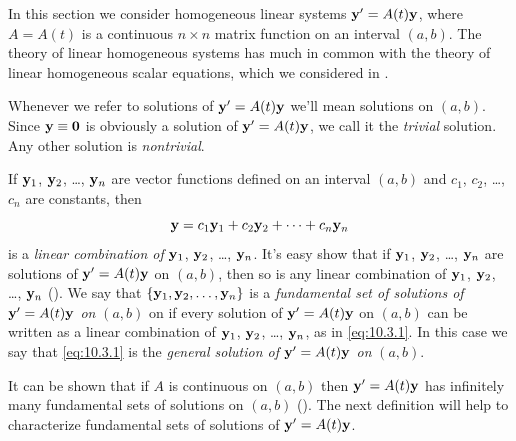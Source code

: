 In this section we consider homogeneous linear systems $\mathbf{y}'=
A(t)\mathbf{y}$, where $A=A(t)$ is a continuous $n\times n$ matrix
function on an interval $(a,b)$. The theory of linear homogeneous
systems has much in common with the theory of linear homogeneous
scalar equations, which we considered in
.

Whenever we refer to solutions of $\mathbf{y}'=A(t)\mathbf{y}$ we'll mean
solutions on $(a,b)$. Since $\mathbf{y}\equiv\mathbf{0}$ is obviously a
solution of $\mathbf{y}'=A(t)\mathbf{y}$, we call it the \emph{\color{blue}trivial}
solution. Any other solution is
\emph{\color{blue}nontrivial}.

If $\mathbf{y}_1$, $\mathbf{y}_2$, \dots, $\mathbf{y}_n$ are vector functions
defined on an interval $(a,b)$ and $c_1$, $c_2$, \dots, $c_n$ are
constants, then
\begin{equation} \label{eq:10.3.1}
\mathbf{y}=c_1\mathbf{y}_1+c_2\mathbf{y}_2+\cdots+c_n\mathbf{y}_n
\end{equation}
is a \emph{\color{blue}linear combination of} $\mathbf{y}_1$, $\mathbf{y}_2$,
\ldots, $\mathbf{y}_n$. It's easy show that if $\mathbf{y}_1$, $\mathbf{y}_2$,
\dots, $\mathbf{y}_n$ are solutions of $\mathbf{y}'=A(t)\mathbf{y}$ on $(a,b)$, then so is any linear combination of
 $\mathbf{y}_1$, $\mathbf{y}_2$, \dots, $\mathbf{y}_n$ (). We say that
$\{\mathbf{y}_1,\mathbf{y}_2,\dots,\mathbf{y}_n\}$ is a
\emph{\color{blue}fundamental set of solutions of $\mathbf{y}'=A(t)\mathbf{y}$ on}
$(a,b)$ on if every solution of
$\mathbf{y}'=A(t)\mathbf{y}$ on $(a,b)$ can be written as a linear combination of
$\mathbf{y}_1$, $\mathbf{y}_2$, \dots, $\mathbf{y}_n$, as in \eqref{eq:10.3.1}.
In this
case we say that \eqref{eq:10.3.1} is the \emph{\color{blue}general solution of $\mathbf{y}'=A(t)\mathbf{y}$ on} $(a,b)$.



It can be shown that if $A$ is continuous on $(a,b)$ then $\mathbf{y}'=A(t)\mathbf{y}$ has infinitely many fundamental sets of solutions on
$(a,b)$ (). The next
definition will help to characterize fundamental sets of solutions of
$\mathbf{y}'=A(t)\mathbf{y}$.


